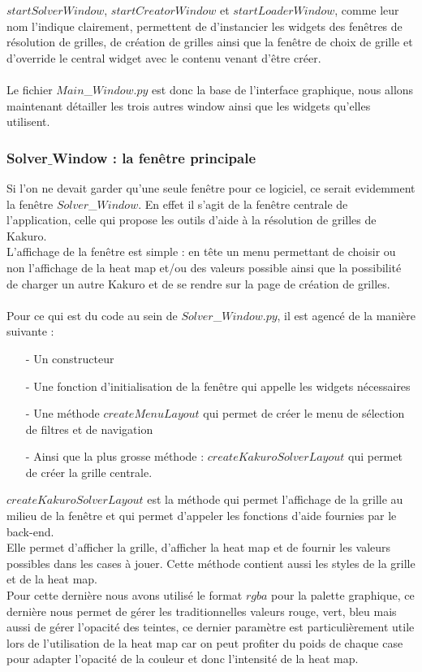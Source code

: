 \documentclass[french,12pt]{article}
\begin{document}
$startSolverWindow$, $startCreatorWindow$ et $startLoaderWindow$, comme leur nom l'indique clairement, permettent de d'instancier les widgets des fenêtres de résolution de grilles, de création de grilles ainsi que la fenêtre de choix de grille et d'override le central widget avec le contenu venant d'être créer. \\ \\

Le fichier $Main$\_$Window.py$ est donc la base de l'interface graphique, nous allons maintenant détailler les trois autres window ainsi que les widgets qu'elles utilisent. 




\subsubsection{Solver$\_$Window : la fenêtre principale}

Si l'on ne devait garder qu'une seule fenêtre pour ce logiciel, ce serait evidemment la fenêtre $Solver$\_$Window$. En effet il s'agit de la fenêtre centrale de l'application, celle qui propose les outils d'aide à la résolution de grilles de Kakuro. \\
L'affichage de la fenêtre est simple : en tête un menu permettant de choisir ou non l'affichage de la heat map et/ou des valeurs possible ainsi que la possibilité de charger un autre Kakuro et de se rendre sur la page de création de grilles. \\ \\

Pour ce qui est du code au sein de $Solver$\_$Window.py$, il est agencé de la manière suivante : \\ 
\begin{itemize}
	\item[-] Un constructeur 
	\item[-] Une fonction d'initialisation de la fenêtre qui appelle les widgets 				nécessaires
	\item[-] Une méthode $createMenuLayout$ qui permet de créer le menu de sélection de filtres et de navigation
	\item[-] Ainsi que la plus grosse méthode : $createKakuroSolverLayout$ qui permet de créer la grille centrale. \\
\end{itemize}

$createKakuroSolverLayout$ est la méthode qui permet l'affichage de la grille au milieu de la fenêtre et qui permet d'appeler les fonctions d'aide fournies par le back-end. \\
Elle permet d'afficher la grille, d'afficher la heat map et de fournir les valeurs possibles dans les cases à jouer. Cette méthode contient aussi les styles de la grille et de la heat map. \\
Pour cette dernière nous avons utilisé le format $rgba$ pour la palette graphique, ce dernière nous permet de gérer les traditionnelles valeurs rouge, vert, bleu mais aussi de gérer l'opacité des teintes, ce dernier paramètre est particulièrement utile lors de l'utilisation de la heat map car on peut profiter du poids de chaque case pour adapter l'opacité de la couleur et donc l'intensité de la heat map. \\ 
\end{document}
